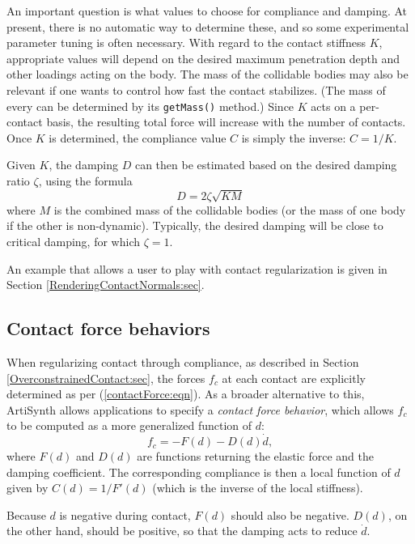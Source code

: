An important question is what values to choose for compliance and
damping. At present, there is no automatic way to determine these, and
so some experimental parameter tuning is often necessary. With regard
to the contact stiffness $K$, appropriate values will depend on the
desired maximum penetration depth and other loadings acting on the
body. The mass of the collidable bodies may also be relevant if one
wants to control how fast the contact stabilizes. (The mass of every
 can be
determined by its {\tt getMass()} method.)  Since $K$ acts on a
per-contact basis, the resulting total force will increase with the
number of contacts. Once $K$ is determined, the compliance value $C$
is simply the inverse: $C = 1/K$.

Given $K$, the damping $D$ can then be estimated based on the desired
damping ratio $\zeta$, using the formula
%
\begin{equation}
D = 2 \zeta \sqrt{K M}
\label{contactDamping:eqn}
\end{equation}
%
where $M$ is the combined mass of the collidable bodies (or the mass
of one body if the other is non-dynamic).  Typically, the desired
damping will be close to critical damping, for which $\zeta = 1$.

An example that allows a user to play with contact regularization is
given in Section \ref{RenderingContactNormals:sec}.

\subsection{Contact force behaviors}
\label{ContactF
orceBehavior:sec}

When regularizing contact through compliance, as described in
Section \ref{OverconstrainedContact:sec}, the forces $f_c$ at each
contact are explicitly determined as per (\ref{contactForce:eqn}).  As
a broader alternative to this, ArtiSynth allows applications to
specify a {\it contact force behavior}, 
which allows $f_c$ to be computed as a more generalized function of
$d$:
%
\begin{equation}
f_c = - F (d) - D (d) \dot d,
\label{generalContactForce:eqn}
\end{equation}
%
where $F(d)$ and $D(d)$ are functions returning the elastic force and
the damping coefficient. The corresponding compliance is then a local
function of $d$ given by $C(d) = 1/F'(d)$ (which is the inverse of the
local stiffness).

\begin{sideblock}
Because $d$ is negative during contact, $F(d)$ should also be
negative.  $D(d)$, on the other hand, should be positive, so that the
damping acts to reduce $\dot d$.
\end{sideblock}

